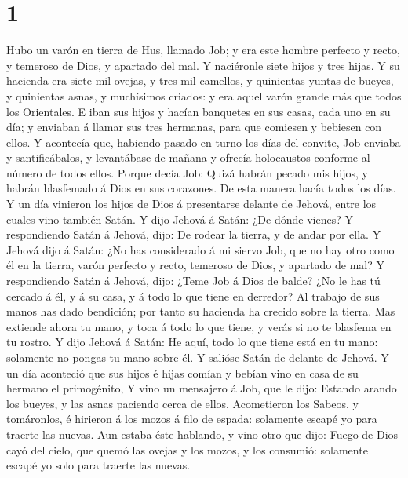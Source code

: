 \hypertarget{section}{%
\section{1}\label{section}}

 Hubo un varón en tierra de Hus, llamado Job; y era este
hombre perfecto y recto, y temeroso de Dios, y apartado del mal.
 Y naciéronle siete hijos y tres hijas.  Y su
hacienda era siete mil ovejas, y tres mil camellos, y quinientas yuntas
de bueyes, y quinientas asnas, y muchísimos criados: y era aquel varón
grande más que todos los Orientales.  E iban sus hijos y
hacían banquetes en sus casas, cada uno en su día; y enviaban á llamar
sus tres hermanas, para que comiesen y bebiesen con ellos. 
Y acontecía que, habiendo pasado en turno los días del convite, Job
enviaba y santificábalos, y levantábase de mañana y ofrecía holocaustos
conforme al número de todos ellos. Porque decía Job: Quizá habrán pecado
mis hijos, y habrán blasfemado á Dios en sus corazones. De esta manera
hacía todos los días.  Y un día vinieron los hijos de Dios á
presentarse delante de Jehová, entre los cuales vino también Satán.
 Y dijo Jehová á Satán: ¿De dónde vienes? Y respondiendo
Satán á Jehová, dijo: De rodear la tierra, y de andar por ella.
 Y Jehová dijo á Satán: ¿No has considerado á mi siervo Job,
que no hay otro como él en la tierra, varón perfecto y recto, temeroso
de Dios, y apartado de mal?  Y respondiendo Satán á Jehová,
dijo: ¿Teme Job á Dios de balde?  ¿No le has tú cercado á
él, y á su casa, y á todo lo que tiene en derredor? Al trabajo de sus
manos has dado bendición; por tanto su hacienda ha crecido sobre la
tierra.  Mas extiende ahora tu mano, y toca á todo lo que
tiene, y verás si no te blasfema en tu rostro.  Y dijo
Jehová á Satán: He aquí, todo lo que tiene está en tu mano: solamente no
pongas tu mano sobre él. Y salióse Satán de delante de Jehová.
 Y un día aconteció que sus hijos é hijas comían y bebían
vino en casa de su hermano el primogénito,  Y vino un
mensajero á Job, que le dijo: Estando arando los bueyes, y las asnas
paciendo cerca de ellos,  Acometieron los Sabeos, y
tomáronlos, é hirieron á los mozos á filo de espada: solamente escapé yo
para traerte las nuevas.  Aun estaba éste hablando, y vino
otro que dijo: Fuego de Dios cayó del cielo, que quemó las ovejas y los
mozos, y los consumió: solamente escapé yo solo para traerte las nuevas.
